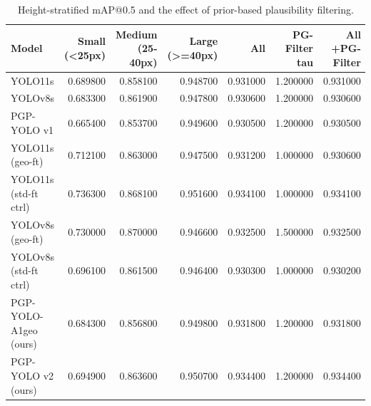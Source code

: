 \begin{table}
\caption{Height-stratified mAP@0.5 and the effect of prior-based plausibility filtering.}
\label{tab:stratified}
\begin{tabular}{lrrrrrr}
\toprule
Model & Small (<25px) & Medium (25-40px) & Large (>=40px) & All & PG-Filter tau & All +PG-Filter \\
\midrule
YOLO11s & 0.689800 & 0.858100 & 0.948700 & 0.931000 & 1.200000 & 0.931000 \\
YOLOv8s & 0.683300 & 0.861900 & 0.947800 & 0.930600 & 1.200000 & 0.930600 \\
PGP-YOLO v1 & 0.665400 & 0.853700 & 0.949600 & 0.930500 & 1.200000 & 0.930500 \\
YOLO11s (geo-ft) & 0.712100 & 0.863000 & 0.947500 & 0.931200 & 1.000000 & 0.930600 \\
YOLO11s (std-ft ctrl) & 0.736300 & 0.868100 & 0.951600 & 0.934100 & 1.000000 & 0.934100 \\
YOLOv8s (geo-ft) & 0.730000 & 0.870000 & 0.946600 & 0.932500 & 1.500000 & 0.932500 \\
YOLOv8s (std-ft ctrl) & 0.696100 & 0.861500 & 0.946400 & 0.930300 & 1.000000 & 0.930200 \\
PGP-YOLO-A1geo (ours) & 0.684300 & 0.856800 & 0.949800 & 0.931800 & 1.200000 & 0.931800 \\
PGP-YOLO v2 (ours) & 0.694900 & 0.863600 & 0.950700 & 0.934400 & 1.200000 & 0.934400 \\
\bottomrule
\end{tabular}
\end{table}
